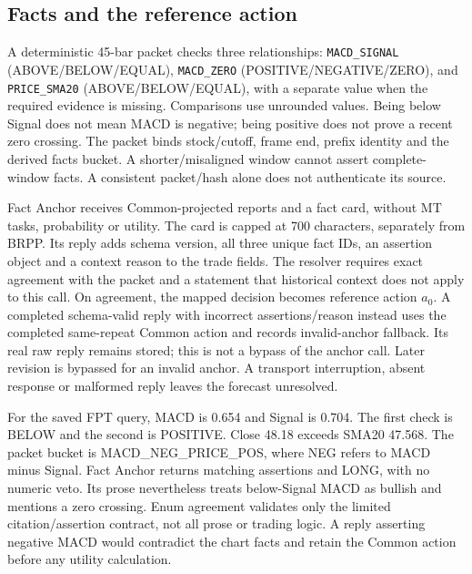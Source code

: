 \subsection{Facts and the reference action}\label{s:20f38305181c1972}
\begingroup\raggedright
A deterministic 45-bar packet checks three relationships:
\texttt{MACD\_SIGNAL} (ABOVE/BELOW/EQUAL), \texttt{MACD\_ZERO}
(POSITIVE/NEGATIVE/ZERO), and \texttt{PRICE\_SMA20} (ABOVE/BELOW/EQUAL),
with a separate value when the required evidence is missing. Comparisons use
unrounded values. Being below Signal does not mean MACD is negative;
being positive does not prove a recent zero crossing. The packet binds
stock/cutoff, frame end, prefix identity and the derived facts bucket.
A shorter/misaligned window cannot assert complete-window facts. A
consistent packet/hash alone does not authenticate its source.\par\endgroup

Fact Anchor receives Common-projected reports and a fact card, without
MT tasks, probability or utility. The card is capped at 700 characters,
separately from BRPP. Its reply adds schema version, all three unique
fact IDs, an assertion object and a context reason to the trade fields.
The resolver requires exact agreement with the packet and a statement
that historical context does not apply to this call. On agreement,
the mapped decision becomes reference action $a_0$.
A completed schema-valid reply with incorrect assertions/reason instead
uses the completed same-repeat Common action and records invalid-anchor
fallback. Its real raw reply remains stored; this is not a bypass of
the anchor call. Later revision is bypassed for an invalid anchor.
A transport interruption, absent response or malformed reply leaves
the forecast unresolved.

For the saved FPT query, MACD is 0.654 and Signal is 0.704.
The first check is BELOW and the second is POSITIVE. Close 48.18 exceeds SMA20
47.568. The packet bucket is MACD\_NEG\_PRICE\_POS, where NEG refers to
MACD minus Signal. Fact Anchor returns matching assertions and LONG,
with no numeric veto. Its prose nevertheless treats below-Signal MACD
as bullish and mentions a zero crossing. Enum agreement validates only
the limited citation/assertion contract, not all prose or trading logic.
A reply asserting negative MACD would contradict the chart facts and
retain the Common action before any utility calculation.

